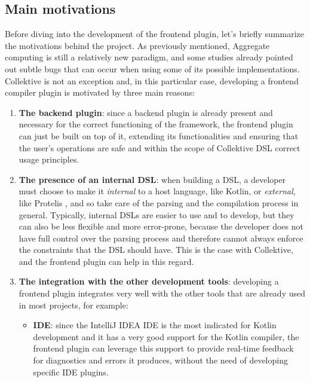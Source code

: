 \documentclass[12pt,a4paper,openright,twoside]{book}
\begin{document}
\subsection{Main motivations}

Before diving into the development of the frontend plugin, let's briefly
summarize the motivations behind the project. As previously mentioned, Aggregate
computing is still a relatively new paradigm, and some studies
\cite{DBLP:conf/saso/AudritoDVC16} already pointed out subtle bugs that can
occur when using some of its possible implementations. 
%
Collektive is not an exception and, in this particular case, developing a
frontend compiler plugin is motivated by three main reasons:
\begin{enumerate}
  \item \textbf{The backend plugin}: since a backend plugin is already present
  and necessary for the correct functioning of the framework, the frontend
  plugin can just be built on top of it, extending its functionalities and
  ensuring that the user's operations are safe and within the scope of
  Collektive DSL correct usage principles.

  \item \textbf{The presence of an internal DSL}: when building a DSL, a
  developer must choose to make it \emph{internal} to a host language, like
  Kotlin, or \emph{external}, like Protelis \cite{DBLP:conf/saso/PianiniBV17},
  and so take care of the parsing and the compilation process in general.
  Typically, internal DSLs are easier to use and to develop, but they can also
  be less flexible and more error-prone, because the developer does not have
  full control over the parsing process and therefore cannot always enforce the
  constraints that the DSL should have. This is the case with Collektive, and
  the frontend plugin can help in this regard.
  
  \item \textbf{The integration with the other development tools}: developing a
  frontend plugin integrates very well with the other tools that are already 
  used in most projects, for example:

  \begin{itemize}
    \item \textbf{IDE}: since the IntelliJ IDEA \ac{IDE} is the most indicated
    for Kotlin development and it has a very good support for the Kotlin
    compiler, the frontend plugin can leverage this support to provide real-time
    feedback for diagnostics and errors it produces, without the need of
    developing specific \ac{IDE} plugins.


\end{itemize}
\end{enumerate}
\end{document}
